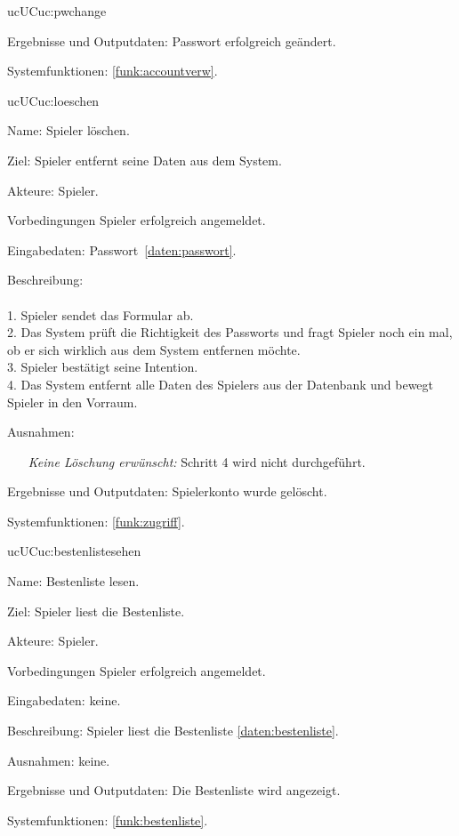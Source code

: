 \begin{description}[leftmargin=5em, style=sameline]
\begin{lhp}{uc}{UC}{uc:pwchange}
\begin{itemize}
		    \end{itemize}
		\item [Ergebnisse und Outputdaten:] Passwort erfolgreich geändert.	
		\item [Systemfunktionen:] \ref{funk:accountverw}.
	\end{lhp}	
	
	\begin{lhp}{uc}{UC}{uc:loeschen}
		\item [Name:] Spieler löschen.
		\item [Ziel:] Spieler entfernt seine Daten aus dem System.
		\item [Akteure:] Spieler.
		\item [Vorbedingungen] Spieler erfolgreich angemeldet.
		\item [Eingabedaten:] Passwort~\ref{daten:passwort}.
		\item [Beschreibung:] \hfill\\ \hfill\\
				1. Spieler sendet das Formular ab.\\
				2. Das System prüft die Richtigkeit des Passworts und fragt Spieler noch ein mal, ob er sich wirklich aus dem System entfernen möchte.\\
				3. Spieler bestätigt seine Intention.\\
				4. Das System entfernt alle Daten des Spielers aus der Datenbank und bewegt Spieler in den Vorraum.\\
		\item [Ausnahmen:] \hfill
			\begin{itemize} 
				\item[] \textit{Keine Löschung erwünscht:} Schritt 4 wird nicht durchgeführt.
				
			\end{itemize}
		\item [Ergebnisse und Outputdaten:] Spielerkonto wurde gelöscht.	
		\item [Systemfunktionen:] \ref{funk:zugriff}.
	\end{lhp}
   
	\begin{lhp}{uc}{UC}{uc:bestenlistesehen}
    	\item [Name:] Bestenliste lesen.
    	\item [Ziel:] Spieler liest die Bestenliste.
    	\item [Akteure:] Spieler.
    	\item [Vorbedingungen] Spieler erfolgreich angemeldet.
    	\item [Eingabedaten:] keine.
    	\item [Beschreibung:] Spieler liest die Bestenliste \ref{daten:bestenliste}.
    	\item [Ausnahmen:] keine.
    	\item [Ergebnisse und Outputdaten:] Die Bestenliste wird angezeigt.	
    	\item [Systemfunktionen:] \ref{funk:bestenliste}.
    \end{lhp}


\end{description}
